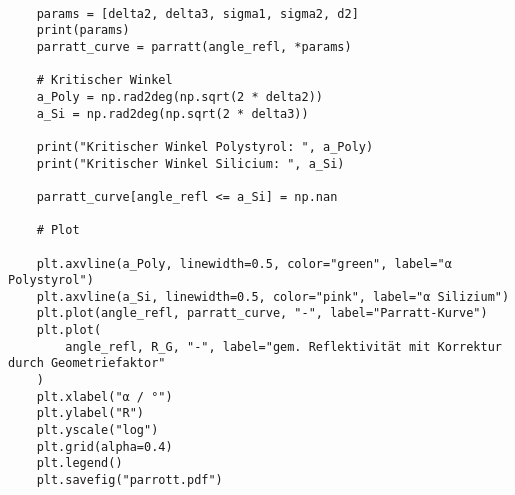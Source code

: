 \begin{lstlisting}
    
    params = [delta2, delta3, sigma1, sigma2, d2]
    print(params)
    parratt_curve = parratt(angle_refl, *params)
    
    # Kritischer Winkel
    a_Poly = np.rad2deg(np.sqrt(2 * delta2))
    a_Si = np.rad2deg(np.sqrt(2 * delta3))
    
    print("Kritischer Winkel Polystyrol: ", a_Poly)
    print("Kritischer Winkel Silicium: ", a_Si)
    
    parratt_curve[angle_refl <= a_Si] = np.nan
    
    # Plot
    
    plt.axvline(a_Poly, linewidth=0.5, color="green", label="α Polystyrol")
    plt.axvline(a_Si, linewidth=0.5, color="pink", label="α Silizium")
    plt.plot(angle_refl, parratt_curve, "-", label="Parratt-Kurve")
    plt.plot(
        angle_refl, R_G, "-", label="gem. Reflektivität mit Korrektur durch Geometriefaktor"
    )
    plt.xlabel("α / °")
    plt.ylabel("R")
    plt.yscale("log")
    plt.grid(alpha=0.4)
    plt.legend()
    plt.savefig("parrott.pdf")
\end{lstlisting}